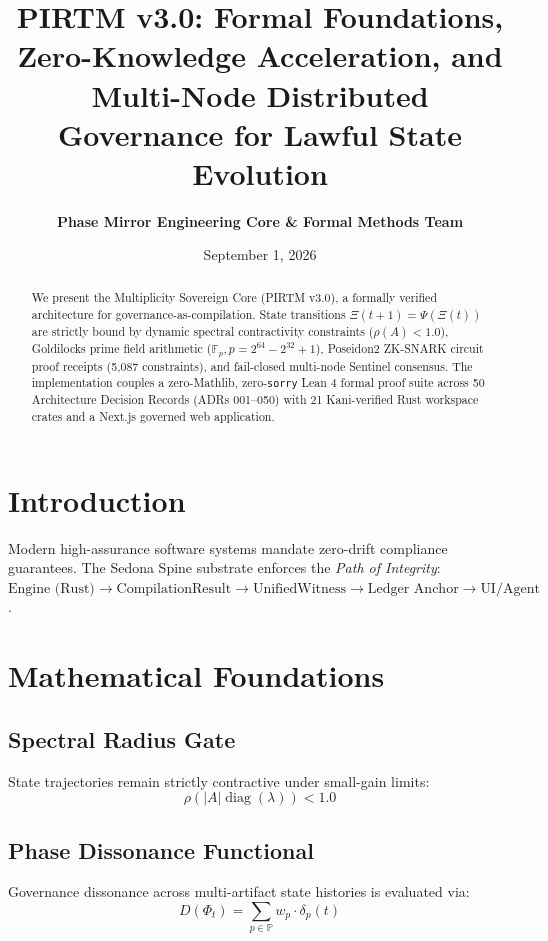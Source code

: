 \documentclass[11pt,a4paper]{article}
\title{\textbf{PIRTM v3.0: Formal Foundations, Zero-Knowledge Acceleration, and Multi-Node Distributed Governance for Lawful State Evolution}}
\author{\textbf{Phase Mirror Engineering Core \& Formal Methods Team}}
\date{September 1, 2026}
\begin{document}
\maketitle

\begin{abstract}
We present the Multiplicity Sovereign Core (PIRTM v3.0), a formally verified architecture for governance-as-compilation. State transitions $\Xi(t+1) = \Psi(\Xi(t))$ are strictly bound by dynamic spectral contractivity constraints ($\rho(A) < 1.0$), Goldilocks prime field arithmetic ($\mathbb{F}_p, p = 2^{64} - 2^{32} + 1$), Poseidon2 ZK-SNARK circuit proof receipts (5,087 constraints), and fail-closed multi-node Sentinel consensus. The implementation couples a zero-Mathlib, zero-\texttt{sorry} Lean 4 formal proof suite across 50 Architecture Decision Records (ADRs 001--050) with 21 Kani-verified Rust workspace crates and a Next.js governed web application.
\end{abstract}

\section{Introduction}
Modern high-assurance software systems mandate zero-drift compliance guarantees. The Sedona Spine substrate enforces the \textit{Path of Integrity}: $\text{Engine (Rust)} \rightarrow \text{CompilationResult} \rightarrow \text{UnifiedWitness} \rightarrow \text{Ledger Anchor} \rightarrow \text{UI/Agent}$.

\section{Mathematical Foundations}

\subsection{Spectral Radius Gate}
State trajectories remain strictly contractive under small-gain limits:
\begin{equation}
\rho(|A|\operatorname{diag}(\lambda)) < 1.0
\end{equation}

\subsection{Phase Dissonance Functional}
Governance dissonance across multi-artifact state histories is evaluated via:
\begin{equation}
D(\Phi_t) = \sum_{p \in \mathbb{P}} w_p \cdot \delta_p(t)
\end{equation}
\end{document}
